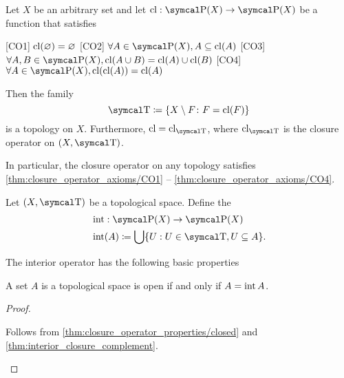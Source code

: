 \begin{proposition}\label{thm:closure_operator_axioms}\cite[14]{Engelking1989}
  Let \( X \) be an arbitrary set and let \( \Cl: \Power(X) \to \Power(X) \) be a function that satisfies
  \begin{description}
    [CO1] \( \operatorname{cl}(\varnothing) = \varnothing \)
    [CO2] \( \forall A \in \Power(X), A \subseteq \Cl(A) \)
    [CO3] \( \forall A, B \in \Power(X), \Cl(A \cup B) = \Cl(A) \cup \Cl(B) \)
    [CO4] \( \forall A \in \Power(X), \Cl(\Cl(A)) = \Cl(A) \)
  \end{description}

  Then the family
  \begin{equation*}
    \CT \coloneqq \{ X \setminus F \colon F = \Cl(F) \}
  \end{equation*}
  is a topology on \( X \). Furthermore, \( \Cl = \Cl_{\CT} \), where \( \Cl_{\CT} \) is the closure operator on \( (X, \CT) \).

  In particular, the closure operator on any topology satisfies \cref{thm:closure_operator_axioms/CO1} -- \cref{thm:closure_operator_axioms/CO4}.
\end{proposition}

\begin{definition}\label{def:interior_operator}\cite[15]{Engelking1989}
  Let \( (X, \CT) \) be a topological space. Define the 
  \begin{align*}
    &\Int: \Power(X) \to \Power(X) \\
    &\Int(A) \coloneqq \bigcup \{ U : U \in \CT, U \subseteq A \}.
  \end{align*}
\end{definition}

\begin{proposition}\label{thm:interior_operator_properties}
  The interior operator has the following basic properties
  \begin{propenum}
     A set \( A \) is a topological space is open if and only if \( A = \operatorname{int} A \).
  \end{propenum}
\end{proposition}
\begin{proof}
  \begin{propenum}
     Follows from \cref{thm:closure_operator_properties/closed} and \cref{thm:interior_closure_complement}.
  \end{propenum}
\end{proof}

